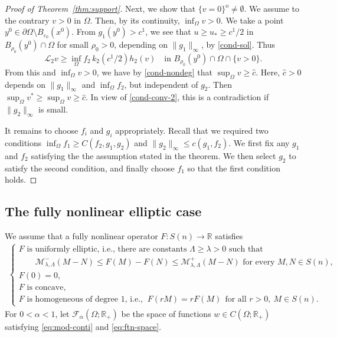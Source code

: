 \documentclass[11pt,oneside,english]{amsart}
\newcommand{\R}{{\mathbb R}}
\newcommand{\cM}{{\mathcal M}}
\newcommand{\cL}{{\mathcal L}}
\newcommand{\cF}{{\mathcal F}}
\newcommand{\e}{\varepsilon}
\newcommand{\al}{\alpha}
\newcommand{\la}{\lambda}
\numberwithin{equation}{section}
\theoremstyle{plain}
\numberwithin{equation}{section}
\begin{document}
\begin{proof}[Proof of Theorem~\ref{thm:support}]
Next, we show that $\{v=0\}^{\mathrm{o}}\neq\emptyset$. We assume to the contrary $v>0$ in $\Omega$. Then, by its continuity, $\inf_\Omega v>0$. We take a point $y^0\in \partial\Omega\setminus B_{\e_0}(x^0)$. From $g_1(y^0)>c^1$, we see that $u\ge u_*\ge c^1/2$ in $B_{\rho_0}(y^0)\cap \Omega$ for small $\rho_0>0$, depending on $\|g_1\|_\infty$, by \ref{cond-sol}. Thus
$$
\cL_2v\ge\inf_{\Omega}f_2\,k_2\left(c^1/2 \right)h_2(v)\quad\text{in }B_{\rho_0}(y^0)\cap\Omega\cap \{v>0\}.
$$
From this and $\inf_{\Omega}v>0$, we have by \ref{cond-nondeg} that $\sup_\Omega v\ge \hat c$. Here, $\hat c>0$ depends on $\|g_1\|_\infty$ and $\inf_\Omega f_2$, but independent of $g_2$. Then $\sup_\Omega v^*\ge \sup_\Omega v\ge \hat c$. In view of \ref{cond-conv-2}, this is a contradiction if $\|g_2\|_\infty$ is small.

It remains to choose $f_i$ and $g_i$ appropriately. Recall that we required two conditions
$\inf_\Omega f_1\ge C(f_2,g_1,g_2)$ and $\|g_2\|_\infty\le c(g_1,f_2)$.
We first fix any $g_1$ and $f_2$ satisfying the the assumption stated in the theorem. We then select $g_2$ to satisfy the second condition, and finally choose $f_1$ so that the first condition holds.
\end{proof}






\subsection{The fully nonlinear elliptic case}
\label{sec:FN-elliptic}

 
We assume that a fully nonlinear operator $F:S(n)\to \R$ satisfies
\begin{align}
    \label{eq:assump-fully-nonlinear}
    \begin{cases}
    \text{$F$ is uniformly elliptic, i.e., there are constants $\Lambda\ge\la>0$ such that}\\
    \qquad \cM^-_{\la,\Lambda}(M-N)\le F(M)-F(N)\le \cM^+_{\la,\Lambda}(M-N)\text{ for every } M,N\in S(n),\\
    F(0)=0,\\
    \text{$F$ is concave},\\
    \text{$F$ is homogeneous of degree $1$, i.e., }    \  F(rM)=rF(M) \ \ \text{for all }   r>0, \ M\in S(n).
    \end{cases}
\end{align}
For $0<\al<1$, let $\cF_\al(\Omega;\R_+)$ be the space of functions $w\in C(\Omega;\R_+)$ satisfying \eqref{eq:mod-conti} and \eqref{eq:ftn-space}.
\end{document}
